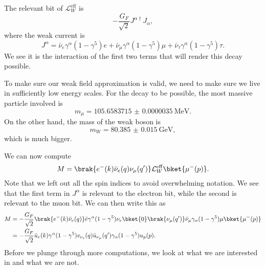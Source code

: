 \documentclass[a4paper]{article}
\begin{document}
The relevant bit of $\mathcal{L}_W^{\mathrm{eff}}$ is
\[
  - \frac{G_F}{\sqrt{2}} J^{\alpha\dagger}J_\alpha,
\]
where the weak current is
\[
  J^\alpha = \bar{\nu}_e \gamma^\alpha (1 - \gamma^5) e + \bar{\nu}_\mu \gamma^\alpha(1 - \gamma^5)\mu + \bar{\nu}_\tau \gamma^\alpha(1 - \gamma^5) \tau.
\]
We see it is the interaction of the first two terms that will render this decay possible.

To make sure our weak field approximation is valid, we need to make sure we live in sufficiently low energy scales. For the decay to be possible, the most massive particle involved is
\[
  m_\mu = \SI{105.6583715(35)}{\mega\electronvolt}.
\]
On the other hand, the mass of the weak boson is
\[
  m_W = \SI{80.385(15)}{\giga\electronvolt},
\]
which is much bigger.

We can now compute
\[
  M = \brak{e^-(k) \bar{\nu}_e (q) \nu_\mu(q')} \mathcal{L}_W^{\mathrm{eff}} \bket{\mu^-(p)}.
\]
Note that we left out all the spin indices to avoid overwhelming notation. We see that the first term in $J^\alpha$ is relevant to the electron bit, while the second is relevant to the muon bit. We can then write this as
\begin{align*}
  M &= -\frac{G_F}{\sqrt{2}} \brak{e^-(k) \bar{\nu}_e(q)} \bar{e} \gamma^\alpha (1 - \gamma^5) \nu_e \bket{0} \brak{\nu_\mu(q')} \bar{\nu}_\mu \gamma_\alpha(1 - \gamma^5) \mu \bket{\mu^-(p)}\\
  &= - \frac{G_F}{\sqrt{2}} \bar{u}_e(k) \gamma^\alpha (1 - \gamma^5)v_{\nu_e}(q) \bar{u}_{\nu_\mu} (q') \gamma_\alpha (1 - \gamma^5) u_p(p).
\end{align*}
Before we plunge through more computations, we look at what we are interested in and what we are not.
\end{document}
